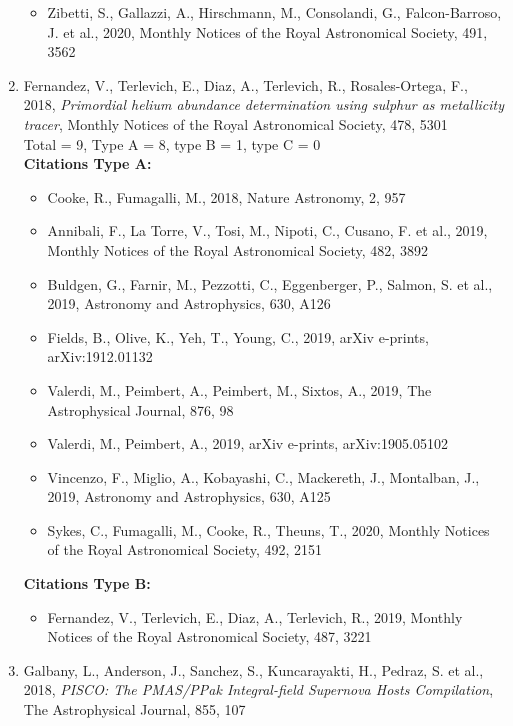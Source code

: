 \documentclass{letter}
\begin{document}
\begin{enumerate}
\begin{itemize}
\item Zibetti, S., Gallazzi, A., Hirschmann, M., Consolandi, G., Falcon-Barroso, J. et al., 2020, Monthly Notices of the Royal Astronomical Society, 491, 3562
\end{itemize}
\item Fernandez, V., Terlevich, E., Diaz, A., Terlevich, R., Rosales-Ortega, F., 2018, {\it Primordial helium abundance determination using sulphur as metallicity tracer}, Monthly Notices of the Royal Astronomical Society, 478, 5301 \\ 
Total = 9, Type A = 8, type B = 1, type C = 0 \\ 
{\bf Citations Type A:}
\begin{itemize}
\item Cooke, R., Fumagalli, M., 2018, Nature Astronomy, 2, 957
\item Annibali, F., La Torre, V., Tosi, M., Nipoti, C., Cusano, F. et al., 2019, Monthly Notices of the Royal Astronomical Society, 482, 3892
\item Buldgen, G., Farnir, M., Pezzotti, C., Eggenberger, P., Salmon, S. et al., 2019, Astronomy and Astrophysics, 630, A126
\item Fields, B., Olive, K., Yeh, T., Young, C., 2019, arXiv e-prints, arXiv:1912.01132
\item Valerdi, M., Peimbert, A., Peimbert, M., Sixtos, A., 2019, The Astrophysical Journal, 876, 98
\item Valerdi, M., Peimbert, A., 2019, arXiv e-prints, arXiv:1905.05102
\item Vincenzo, F., Miglio, A., Kobayashi, C., Mackereth, J., Montalban, J., 2019, Astronomy and Astrophysics, 630, A125
\item Sykes, C., Fumagalli, M., Cooke, R., Theuns, T., 2020, Monthly Notices of the Royal Astronomical Society, 492, 2151
\end{itemize}
{\bf Citations Type B:}
\begin{itemize}
\item Fernandez, V., Terlevich, E., Diaz, A., Terlevich, R., 2019, Monthly Notices of the Royal Astronomical Society, 487, 3221
\end{itemize}
\item Galbany, L., Anderson, J., Sanchez, S., Kuncarayakti, H., Pedraz, S. et al., 2018, {\it PISCO: The PMAS/PPak Integral-field Supernova Hosts Compilation}, The Astrophysical Journal, 855, 107 \\ 

\end{enumerate}
\end{document}
